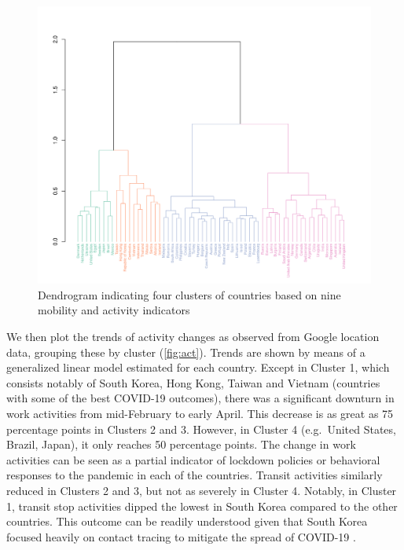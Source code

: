 \documentclass[preprint, 11pt]{elsarticle}
\newcommand{\?}{\stackrel{?}{=}}
\begin{document}
\begin{figure}[h!]
  \includegraphics[width=\textwidth,trim={0cm 0 1.9cm 7cm},clip]{dendrogram}
  \caption{Dendrogram indicating four clusters of countries based on nine mobility and activity indicators}
  \label{fig:dend}
\end{figure}

We then plot the trends of activity changes as observed from Google location data, grouping these by cluster (\autoref{fig:act}).
Trends are shown by means of a generalized linear model estimated for each country.
Except in Cluster 1, which consists notably of South Korea, Hong Kong, Taiwan and Vietnam (countries with some of the best COVID-19 outcomes),
there was a significant downturn in work activities from mid-February to early April.
This decrease is as great as 75 percentage points in Clusters 2 and 3.
However, in Cluster 4 (e.g.\ United States, Brazil, Japan), it only reaches 50 percentage points.
The change in work activities can be seen as a partial indicator of lockdown policies or behavioral responses to the pandemic in each of the countries.
Transit activities similarly reduced in Clusters 2 and 3, but not as severely in Cluster 4.
Notably, in Cluster 1, transit stop activities dipped the lowest in South Korea compared to the other countries.
This outcome can be readily understood given that South Korea focused heavily on contact tracing to mitigate the spread of COVID-19 \cite{aum2020covid19,parkearly}.
\end{document}
